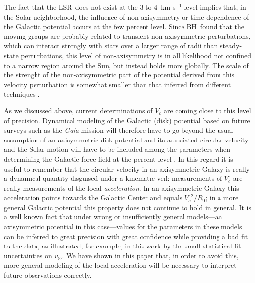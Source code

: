\documentclass[12pt,preprint]{aastex}
\newcommand{\eg}{e.g.}
\newcommand{\vsunlsr}{\ensuremath{v_\odot}}
\newcommand{\lsrabb}{LSR}
\newcommand{\resultrange}{3 to 4}
\newcommand{\vcirc}{\ensuremath{V_c}}
\newcommand{\bh}{BH}
\begin{document}
The fact that the \lsrabb\ does not exist at the \resultrange\ km
s$^{-1}$ level implies that, in the Solar neighborhood, the influence
of non-axisymmetry or time-dependence of the Galactic potential occurs
at the few percent level. Since \bh\ found that the moving groups are
probably related to transient non-axisymmetric perturbations, which
can interact strongly with stars over a larger range of radii than
steady-state perturbations, this level of non-axisymmetry is in all
likelihood not confined to a narrow region around the Sun, but instead
holds more globally. The scale of the strenght of the non-axisymmetric
part of the potential derived from this velocity perturbation is
somewhat smaller than that inferred from different techniques
\citep[\eg][]{Jenkins90a,Kuijken94a}.

As we discussed above, current determinations of $\vcirc$ are coming
close to this level of precision. Dynamical modeling of the Galactic
(disk) potential based on future surveys such as the \emph{Gaia}
mission \citep{Perryman01a} will therefore have to go beyond the usual
assumption of an axisymmetric disk potential and its associated
circular velocity and the Solar motion will have to be included among
the parameters when determining the Galactic force field at the
percent level \citep[see, \eg,][]{Sumi09a}. In this regard it is
useful to remember that the circular velocity in an axisymmetric
Galaxy is really a dynamical quantity disguised under a kinematic
veil: measurements of $\vcirc$ are really measurements of the local
\emph{acceleration}. In an axisymmetric Galaxy this acceleration
points towards the Galactic Center and equals $\vcirc^2/R_0$; in a
more general Galactic potential this property does not continue to
hold in general. It is a well known fact that under wrong or
insufficiently general models---an axisymmetric potential in this
case---values for the parameters in these models can be inferred to
great precision with great confidence while providing a bad fit to the
data, as illustrated, for example, in this work by the small
statistical fit uncertainties on \vsunlsr. We have shown in this paper
that, in order to avoid this, more general modeling of the local
acceleration will be necessary to interpret future observations
correctly.
\end{document}
